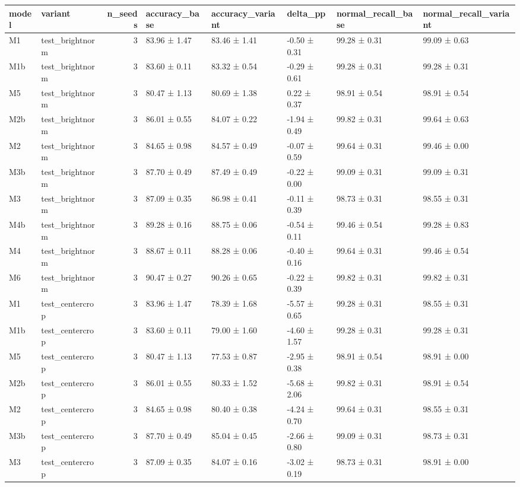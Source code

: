 \begin{tabular}{llrlllll}
\toprule
model & variant & n\_seeds & accuracy\_base & accuracy\_variant & delta\_pp & normal\_recall\_base & normal\_recall\_variant \\
\midrule
M1 & test\_brightnorm & 3 & 83.96 ± 1.47 & 83.46 ± 1.41 & -0.50 ± 0.31 & 99.28 ± 0.31 & 99.09 ± 0.63 \\
M1b & test\_brightnorm & 3 & 83.60 ± 0.11 & 83.32 ± 0.54 & -0.29 ± 0.61 & 99.28 ± 0.31 & 99.28 ± 0.31 \\
M5 & test\_brightnorm & 3 & 80.47 ± 1.13 & 80.69 ± 1.38 & 0.22 ± 0.37 & 98.91 ± 0.54 & 98.91 ± 0.54 \\
M2b & test\_brightnorm & 3 & 86.01 ± 0.55 & 84.07 ± 0.22 & -1.94 ± 0.49 & 99.82 ± 0.31 & 99.64 ± 0.63 \\
M2 & test\_brightnorm & 3 & 84.65 ± 0.98 & 84.57 ± 0.49 & -0.07 ± 0.59 & 99.64 ± 0.31 & 99.46 ± 0.00 \\
M3b & test\_brightnorm & 3 & 87.70 ± 0.49 & 87.49 ± 0.49 & -0.22 ± 0.00 & 99.09 ± 0.31 & 99.09 ± 0.31 \\
M3 & test\_brightnorm & 3 & 87.09 ± 0.35 & 86.98 ± 0.41 & -0.11 ± 0.39 & 98.73 ± 0.31 & 98.55 ± 0.31 \\
M4b & test\_brightnorm & 3 & 89.28 ± 0.16 & 88.75 ± 0.06 & -0.54 ± 0.11 & 99.46 ± 0.54 & 99.28 ± 0.83 \\
M4 & test\_brightnorm & 3 & 88.67 ± 0.11 & 88.28 ± 0.06 & -0.40 ± 0.16 & 99.64 ± 0.31 & 99.46 ± 0.54 \\
M6 & test\_brightnorm & 3 & 90.47 ± 0.27 & 90.26 ± 0.65 & -0.22 ± 0.39 & 99.82 ± 0.31 & 99.82 ± 0.31 \\
M1 & test\_centercrop & 3 & 83.96 ± 1.47 & 78.39 ± 1.68 & -5.57 ± 0.65 & 99.28 ± 0.31 & 98.55 ± 0.31 \\
M1b & test\_centercrop & 3 & 83.60 ± 0.11 & 79.00 ± 1.60 & -4.60 ± 1.57 & 99.28 ± 0.31 & 99.28 ± 0.31 \\
M5 & test\_centercrop & 3 & 80.47 ± 1.13 & 77.53 ± 0.87 & -2.95 ± 0.38 & 98.91 ± 0.54 & 98.91 ± 0.00 \\
M2b & test\_centercrop & 3 & 86.01 ± 0.55 & 80.33 ± 1.52 & -5.68 ± 2.06 & 99.82 ± 0.31 & 98.91 ± 0.54 \\
M2 & test\_centercrop & 3 & 84.65 ± 0.98 & 80.40 ± 0.38 & -4.24 ± 0.70 & 99.64 ± 0.31 & 98.55 ± 0.31 \\
M3b & test\_centercrop & 3 & 87.70 ± 0.49 & 85.04 ± 0.45 & -2.66 ± 0.80 & 99.09 ± 0.31 & 98.73 ± 0.31 \\
M3 & test\_centercrop & 3 & 87.09 ± 0.35 & 84.07 ± 0.16 & -3.02 ± 0.19 & 98.73 ± 0.31 & 98.91 ± 0.00 \\

\end{tabular}
